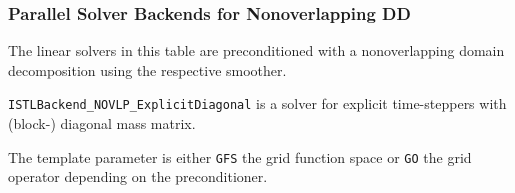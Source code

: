 \documentclass[aspectratio=169,11pt]{beamer}
\theoremstyle{definition}
\begin{document}
\begin{frame}
  \frametitle{Parallel Solver Backends for Nonoverlapping DD}
The linear solvers in this table are preconditioned with a nonoverlapping domain decomposition
using the respective smoother.\medskip

\medskip

\lstinline!ISTLBackend_NOVLP_ExplicitDiagonal! is a solver for explicit
time-steppers with (block-) diagonal mass matrix.

The template parameter is either \lstinline!GFS! the grid function space or \lstinline!GO! the grid operator depending on the preconditioner.
\end{frame}
\end{document}
